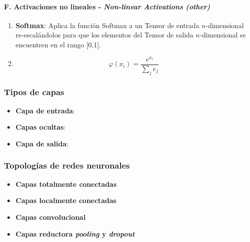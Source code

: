 \paragraph*{F. Activaciones no lineales - \textit{Non-linear Activations (other)} \cite{pytorch2024github}}

\begin{enumerate}
    \item \textbf{Softmax}: Aplica la función Softmax a un Tensor de entrada $n$-dimensional re-escalándolos para que los elementos del Tensor de salida $n$-dimensional se encuentren en el rango [0,1]. \cite{pytorch2024github}
    \item[] \begin{equation} \varphi(x_{i}) = \frac{e^{x_{i}}}{\sum_{j}{e_{j}}} \end{equation}
\end{enumerate}



\subsubsection{Tipos de capas}


\begin{itemize}
    \item \textbf{Capa de entrada}:
    \item \textbf{Capas ocultas}:
    \item \textbf{Capa de salida}:
\end{itemize}





\subsubsection{Topologías de redes neuronales}

\begin{itemize}
    \item \textbf{Capas totalmente conectadas}
    \item \textbf{Capas localmente conectadas}
    \item \textbf{Capas convolucional}
    \item \textbf{Capas reductora \textit{pooling} y \textit{dropout}}
\end{itemize}

